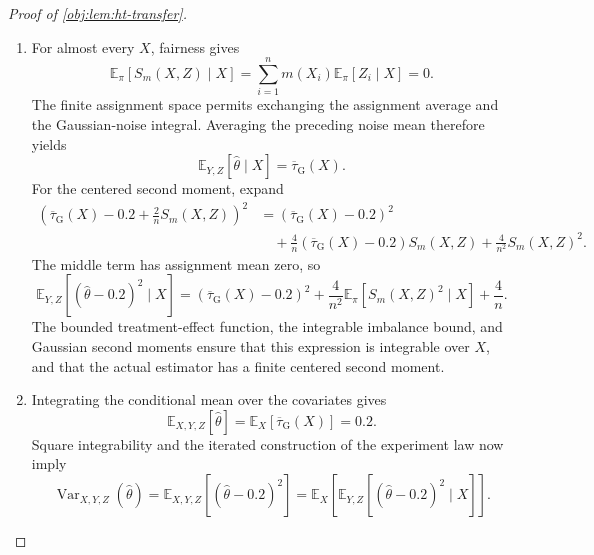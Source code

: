 \begin{proof}[Proof of \cref{obj:lem:ht-transfer}]
\begin{enumerate}
\item
For almost every \(X\), fairness gives
\[
\mathbb E_\pi[S_m(X,Z)\mid X]
=
\sum_{i=1}^n m(X_i)\mathbb E_\pi[Z_i\mid X]
=
0.
\]
The finite assignment space permits exchanging the assignment average and the Gaussian-noise integral. Averaging the preceding noise mean therefore yields
\[
\mathbb E_{Y,Z}[\widehat\theta\mid X]
=
\overline\tau_{\mathrm G}(X).
\]
For the centered second moment, expand
\[
\begin{aligned}
\left(
\overline\tau_{\mathrm G}(X)-0.2+\frac2n S_m(X,Z)
\right)^2
&=
(\overline\tau_{\mathrm G}(X)-0.2)^2\\
&\quad+
\frac4n(\overline\tau_{\mathrm G}(X)-0.2)S_m(X,Z)
+\frac4{n^2}S_m(X,Z)^2.
\end{aligned}
\]
The middle term has assignment mean zero, so
\[
\mathbb E_{Y,Z}[(\widehat\theta-0.2)^2\mid X]
=
(\overline\tau_{\mathrm G}(X)-0.2)^2
+\frac4{n^2}\mathbb E_\pi[S_m(X,Z)^2\mid X]
+\frac4n.
\]
The bounded treatment-effect function, the integrable imbalance bound, and Gaussian second moments ensure that this expression is integrable over \(X\), and that the actual estimator has a finite centered second moment. %

\item
Integrating the conditional mean over the covariates gives
\[
\mathbb E_{X,Y,Z}[\widehat\theta]
=
\mathbb E_X[\overline\tau_{\mathrm G}(X)]
=
0.2.
\]
Square integrability and the iterated construction of the experiment law now imply
\[
\operatorname{Var}_{X,Y,Z}(\widehat\theta)
=
\mathbb E_{X,Y,Z}[(\widehat\theta-0.2)^2]
=
\mathbb E_X\!\left[
\mathbb E_{Y,Z}[(\widehat\theta-0.2)^2\mid X]
\right].
\]


\end{enumerate}
\end{proof}
